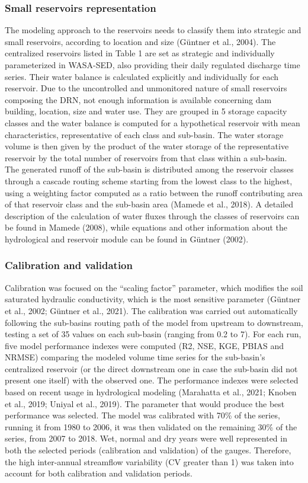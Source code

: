 \documentclass[draft]{agujournal2019}
\begin{document}
\subsubsection{Small reservoirs representation}
The modeling approach to the reservoirs needs to classify them into strategic and small reservoirs, according to location and size (Güntner et al., 2004). The centralized reservoirs listed in Table 1 are set as strategic and individually parameterized in WASA-SED, also providing their daily regulated discharge time series. Their water balance is calculated explicitly and individually for each reservoir. Due to the uncontrolled and unmonitored nature of small reservoirs composing the DRN, not enough information is available concerning dam building, location, size and water use. They are grouped in 5 storage capacity classes and the water balance is computed for a hypothetical reservoir with mean characteristics, representative of each class and sub-basin. The water storage volume is then given by the product of the water storage of the representative reservoir by the total number of reservoirs from that class within a sub-basin. The generated runoff of the sub-basin is distributed among the reservoir classes through a cascade routing scheme starting from the lowest class to the highest, using a weighting factor computed as a ratio between the runoff contributing area of that reservoir class and the sub-basin area (Mamede et al., 2018). A detailed description of the calculation of water fluxes through the classes of reservoirs can be found in Mamede (2008), while equations and other information about the hydrological and reservoir module can be found in Güntner (2002).

\subsubsection{Calibration and validation}
Calibration was focused on the “scaling factor” parameter, which modifies the soil saturated hydraulic conductivity, which is the most sensitive parameter  (Güntner et al., 2002; Güntner et al., 2021). The calibration was carried out automatically following the sub-basins routing path of the model from upstream to downstream, testing a set of 35 values on each sub-basin (ranging from 0.2 to 7). For each run, five model performance indexes were computed (R2, NSE, KGE, PBIAS and NRMSE) comparing the modeled volume time series for the sub-basin’s centralized reservoir (or the direct downstream one in case the sub-basin did not present one itself) with the observed one. The performance indexes were selected based on recent usage in hydrological modeling (Marahatta et al., 2021; Knoben et al., 2019; Uniyal et al., 2019). The parameter that would produce the best performance was selected. The model was calibrated with 70\% of the series, running it from 1980 to 2006, it was then validated on the remaining 30\% of the series, from 2007 to 2018. Wet, normal and dry years were well represented in both the selected periods (calibration and validation) of the gauges. Therefore, the high inter-annual streamflow variability (CV greater than 1) was taken into account for both calibration and validation periods.
\end{document}
